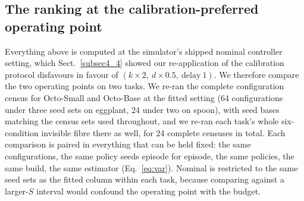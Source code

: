 \documentclass[pdflatex,iicol,sn-apa]{sn-jnl}
\theoremstyle{remark}
\begin{document}
\subsection{The ranking at the calibration-preferred operating point}\label{subsec7_7}

Everything above is computed at the simulator's shipped nominal controller setting, which
Sect.~\ref{subsec4_4} showed our re-application of the calibration protocol disfavours in favour of
$(k{\times}2,\ d{\times}0.5,\ \text{delay}\ 1)$. We therefore compare the two operating points on two tasks. We re-ran the complete configuration census for
Octo-Small and Octo-Base at the fitted setting (64 configurations under three
seed sets on eggplant, 24 under two on spoon), with seed bases matching the census sets used
throughout, and we re-ran each task's whole six-condition invisible fibre there as well, for 24
complete censuses in total. Each comparison is paired in everything that can be
held fixed: the same configurations, the same policy seeds episode for episode, the same
policies, the same build, the same estimator (Eq.~\eqref{eq:var}). Nominal is restricted to the
same seed sets as the fitted column within each task, because comparing against a larger-$S$
interval would confound the operating point with the budget.
\end{document}
